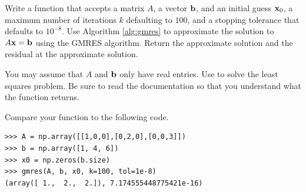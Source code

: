 
\begin{problem}
Write a function that accepts a matrix $A$, a vector $\mathbf{b}$, and an initial guess $\mathbf{x}_0$, a maximum number of iterations $k$ defaulting to $100$, and a stopping tolerance  that defaults to $10^{-8}$.
Use Algorithm \ref{alg:gmres} to approximate the solution to $A\mathbf{x}=\mathbf{b}$ using the GMRES algorithm.
Return the approximate solution and the residual at the approximate solution.

You may assume that $A$ and $\mathbf{b}$ only have real entries.
Use  to solve the least squares problem.
Be sure to read the documentation so that you understand what the function returns.

Compare your function to the following code.
\begin{lstlisting}
>>> A = np.array([[1,0,0],[0,2,0],[0,0,3]])
>>> b = np.array([1, 4, 6])
>>> x0 = np.zeros(b.size)
>>> gmres(A, b, x0, k=100, tol=1e-8)
(array([ 1.,  2.,  2.]), 7.174555448775421e-16)
\end{lstlisting}
\label{prob:MyGMRES}
\end{problem}

